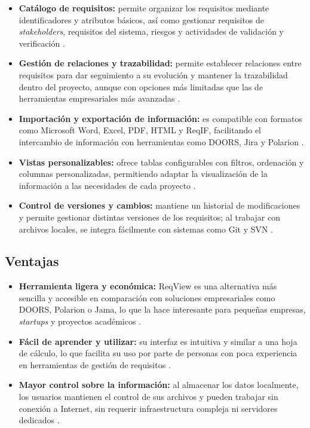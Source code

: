 \documentclass[journal,onecolumn]{IEEEtran}
\begin{document}
\begin{itemize}
	\item \textbf{Catálogo de requisitos:} permite organizar los requisitos mediante
	identificadores y atributos básicos, así como gestionar requisitos de
	\textit{stakeholders}, requisitos del sistema, riesgos y actividades de validación
	y verificación \cite{khoroshilov2019}.

	\item \textbf{Gestión de relaciones y trazabilidad:} permite establecer relaciones
	entre requisitos para dar seguimiento a su evolución y mantener la trazabilidad
	dentro del proyecto, aunque con opciones más limitadas que las de herramientas
	empresariales más avanzadas \cite{khoroshilov2019}.

	\item \textbf{Importación y exportación de información:} es compatible con formatos
	como Microsoft Word, Excel, PDF, HTML y ReqIF, facilitando el intercambio de
	información con herramientas como DOORS, Jira y Polarion \cite{reqview2026import}.

	\item \textbf{Vistas personalizables:} ofrece tablas configurables con filtros,
	ordenación y columnas personalizadas, permitiendo adaptar la visualización de la
	información a las necesidades de cada proyecto \cite{reqview2026features}.

	\item \textbf{Control de versiones y cambios:} mantiene un historial de
	modificaciones y permite gestionar distintas versiones de los requisitos; al
	trabajar con archivos locales, se integra fácilmente con sistemas como Git y SVN
	\cite{khoroshilov2019}.
\end{itemize}

\subsection{Ventajas}

\begin{itemize}
	\item \textbf{Herramienta ligera y económica:} ReqView es una alternativa más
	sencilla y accesible en comparación con soluciones empresariales como DOORS,
	Polarion o Jama, lo que la hace interesante para pequeñas empresas,
	\textit{startups} y proyectos académicos \cite{reqview2026pricing}.

	\item \textbf{Fácil de aprender y utilizar:} su interfaz es intuitiva y similar a
	una hoja de cálculo, lo que facilita su uso por parte de personas con poca
	experiencia en herramientas de gestión de requisitos \cite{reqview2026version}.

	\item \textbf{Mayor control sobre la información:} al almacenar los datos
	localmente, los usuarios mantienen el control de sus archivos y pueden trabajar
	sin conexión a Internet, sin requerir infraestructura compleja ni servidores
	dedicados \cite{reqview2026features}.
\end{itemize}
\end{document}
